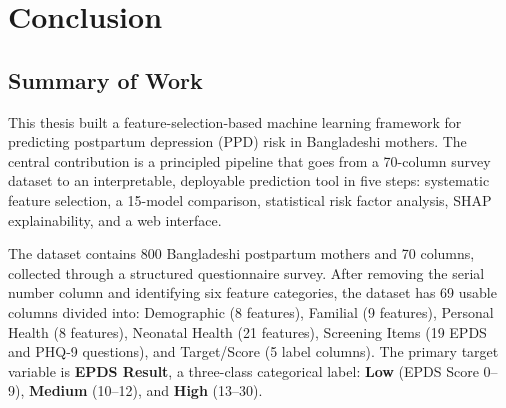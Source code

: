 
\chapter{Conclusion}
\label{ch:conclusion}

\section{Summary of Work}
\label{ch5-sec-summary}

This thesis built a feature-selection-based machine learning framework for predicting postpartum depression (PPD) risk in Bangladeshi mothers.
The central contribution is a principled pipeline that goes from a 70-column survey dataset to an interpretable, deployable prediction tool in five steps: systematic feature selection, a 15-model comparison, statistical risk factor analysis, SHAP explainability, and a web interface.

The dataset contains 800 Bangladeshi postpartum mothers and 70 columns, collected through a structured questionnaire survey.
After removing the serial number column and identifying six feature categories, the dataset has 69 usable columns divided into: Demographic (8 features), Familial (9 features), Personal Health (8 features), Neonatal Health (21 features), Screening Items (19 EPDS and PHQ-9 questions), and Target/Score (5 label columns).
The primary target variable is \textbf{EPDS Result}, a three-class categorical label: \textbf{Low} (EPDS Score 0--9), \textbf{Medium} (10--12), and \textbf{High} (13--30).

